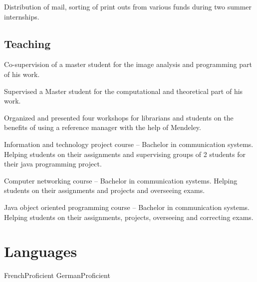 \documentclass[11pt,a4paper,nolmodern, sans]{moderncv}        %
\begin{document}
{Distribution of mail, sorting of print outs from various funds during two summer internships.}


\subsection{Teaching}

{Co-supervision of a master student for the image analysis and programming part of his work.
}

{Supervised a Master student for the computational and theoretical part of his work. }

{Organized and presented four workshops for librarians and students on the benefits of using a reference manager with the help of Mendeley.
}

{Information and technology project course -- Bachelor in communication systems. Helping students on their assignments and supervising groups of 2 students for their java programming project.}

{Computer networking course -- Bachelor in communication systems. Helping students on their assignments and projects and overseeing exams.}

{Java object oriented programming course -- Bachelor in communication systems. Helping students on their assignments, projects, overseeing and correcting exams.}{}


\section{Languages}
  {French}{Proficient}
    {German}{Proficient}
\end{document}
